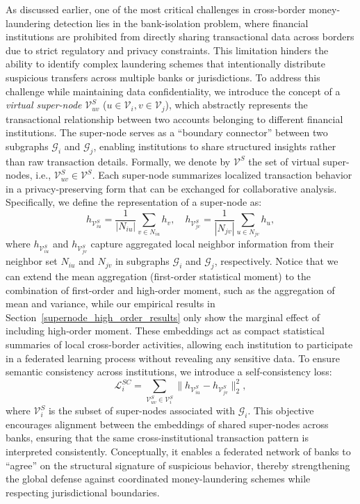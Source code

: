 \documentclass[11pt,english]{article}
\newcommand{\lc}[1]{{\textsf{\textcolor{blue}{[LC: #1]}}}}
\begin{document}
As discussed earlier, one of the most critical challenges in cross-border money-laundering detection lies in the bank-isolation problem, where financial institutions are prohibited from directly sharing transactional data across borders due to strict regulatory and privacy constraints. This limitation hinders the ability to identify complex laundering schemes that intentionally distribute suspicious transfers across multiple banks or jurisdictions. To address this challenge while maintaining data confidentiality, we introduce the concept of a \textit{virtual super-node} $\mathcal{V}^S_{uv}$ ($u \in \mathcal{V}_i, v \in \mathcal{V}_j$), which abstractly represents the transactional relationship between two accounts belonging to different financial institutions. The super-node serves as a ``boundary connector'' between two subgraphs $\mathcal{G}_i$ and $\mathcal{G}_j$, enabling institutions to share structured insights rather than raw transaction details. Formally, we denote by $\mathcal{V}^S$ the set of virtual super-nodes, i.e., $\mathcal{V}^S_{uv} \in \mathcal{V}^S$. Each super-node summarizes localized transaction behavior in a privacy-preserving form that can be exchanged for collaborative analysis. 
Specifically, we define the representation of a super-node as: 
\begin{equation}
    h_{\mathcal{V}^S_{iu}} = \frac{1}{|N_{iu}|}\sum_{v \in N_{iu}} h_v, \quad
    h_{\mathcal{V}^S_{jv}} = \frac{1}{|N_{jv}|}\sum_{u \in N_{jv}} h_u,
\end{equation}
where $h_{\mathcal{V}^S_{iu}}$ and $h_{\mathcal{V}^S_{jv}}$ capture aggregated local neighbor information from their neighbor set $N_{iu}$ and $N_{jv}$ in subgraphs $\mathcal{G}_i$ and $\mathcal{G}_j$, respectively. Notice that we can extend the mean aggregation (first-order statistical moment) to the combination of first-order and high-order moment, such as the aggregation of mean and variance, while our empirical results in Section~\ref{supernode_high_order_results} only show the marginal effect of including high-order moment. These embeddings act as compact statistical summaries of local cross-border activities, allowing each institution to participate in a federated learning process without revealing any sensitive data. To ensure semantic consistency across institutions, we introduce a self-consistency loss:
\begin{equation}
    \mathcal{L}_i^{SC} = \sum_{\mathcal{V}^S_{uv} \in \mathcal{V}^S_i} \| h_{\mathcal{V}^S_{iu}} - h_{\mathcal{V}^S_{jv}} \|_2^2,
\end{equation}
where $\mathcal{V}^S_i$ is the subset of super-nodes associated with $\mathcal{G}_i$. This objective encourages alignment between the embeddings of shared super-nodes across banks, ensuring that the same cross-institutional transaction pattern is interpreted consistently. Conceptually, it enables a federated network of banks to ``agree'' on the structural signature of suspicious behavior, thereby strengthening the global defense against coordinated money-laundering schemes while respecting jurisdictional boundaries.
\end{document}
